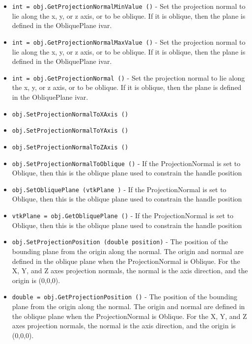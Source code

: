 \begin{itemize}
\item  \verb|int = obj.GetProjectionNormalMinValue ()| -  Set the projection normal to lie along the x, y, or z axis,
 or to be oblique. If it is oblique, then the plane is 
 defined in the ObliquePlane ivar.

\item  \verb|int = obj.GetProjectionNormalMaxValue ()| -  Set the projection normal to lie along the x, y, or z axis,
 or to be oblique. If it is oblique, then the plane is 
 defined in the ObliquePlane ivar.

\item  \verb|int = obj.GetProjectionNormal ()| -  Set the projection normal to lie along the x, y, or z axis,
 or to be oblique. If it is oblique, then the plane is 
 defined in the ObliquePlane ivar.

\item  \verb|obj.SetProjectionNormalToXAxis ()|

\item  \verb|obj.SetProjectionNormalToYAxis ()|

\item  \verb|obj.SetProjectionNormalToZAxis ()|

\item  \verb|obj.SetProjectionNormalToOblique ()| -  If the ProjectionNormal is set to Oblique, then this is the 
 oblique plane used to constrain the handle position

\item  \verb|obj.SetObliquePlane (vtkPlane )| -  If the ProjectionNormal is set to Oblique, then this is the 
 oblique plane used to constrain the handle position

\item  \verb|vtkPlane = obj.GetObliquePlane ()| -  If the ProjectionNormal is set to Oblique, then this is the 
 oblique plane used to constrain the handle position

\item  \verb|obj.SetProjectionPosition (double position)| -  The position of the bounding plane from the origin along the
 normal. The origin and normal are defined in the oblique plane
 when the ProjectionNormal is Oblique. For the X, Y, and Z
 axes projection normals, the normal is the axis direction, and
 the origin is (0,0,0).

\item  \verb|double = obj.GetProjectionPosition ()| -  The position of the bounding plane from the origin along the
 normal. The origin and normal are defined in the oblique plane
 when the ProjectionNormal is Oblique. For the X, Y, and Z
 axes projection normals, the normal is the axis direction, and
 the origin is (0,0,0).


\end{itemize}
